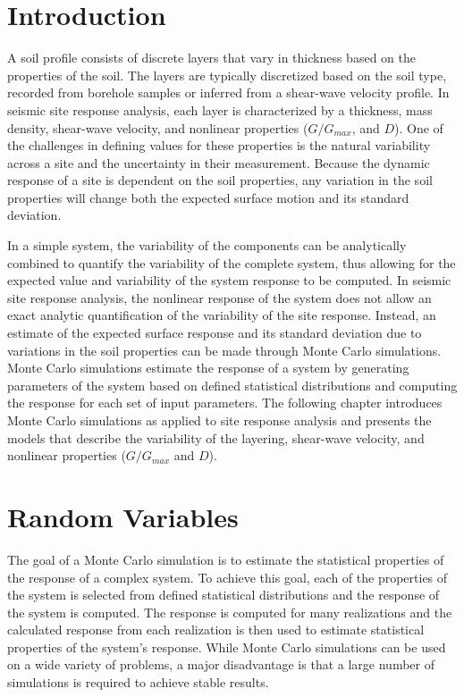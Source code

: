 \documentclass[11pt]{report}
\begin{document}
\section{Introduction}
A soil profile consists of discrete layers that vary in thickness based on the properties of the
soil.  The layers are typically discretized based on the soil type, recorded from borehole samples
or inferred from a shear-wave velocity profile. In seismic site response analysis, each layer is
characterized by a thickness, mass density, shear-wave velocity, and nonlinear properties
($G/G_{max}$, and $D$).  One of the challenges in defining values for these properties is the
natural variability across a site and the uncertainty in their measurement.  Because the dynamic response of
a site is dependent on the soil properties, any variation in the soil properties will change both
the expected surface motion and its standard deviation.

In a simple system, the variability of the components can be analytically combined to quantify the
variability of the complete system, thus allowing for the expected value and variability of the
system response to be computed. In seismic site response analysis, the nonlinear response of the
system does not allow an exact analytic quantification of the variability of the site response.
Instead, an estimate of the expected surface response and its standard deviation due to variations
in the soil properties can be made through Monte Carlo simulations.  Monte Carlo simulations
estimate the response of a system by generating parameters of the system based on defined
statistical distributions and computing the response for each set of input parameters.  The
following chapter introduces Monte Carlo simulations as applied to site response analysis and
presents the models that describe the variability of the layering, shear-wave velocity, and
nonlinear properties ($G/G_{max}$ and $D$).  

\section{Random Variables}
The goal of a Monte Carlo simulation is to estimate the statistical properties of the response of a
complex system.  To achieve this goal, each of the properties of the system is selected from defined
statistical distributions and the response of the system is computed.  The response is computed for
many realizations and the calculated response from each realization is then used to estimate
statistical properties of the system's response. While Monte Carlo simulations can be used on a wide
variety of problems, a major disadvantage is that a large number of simulations is required to
achieve stable results.
\end{document}

